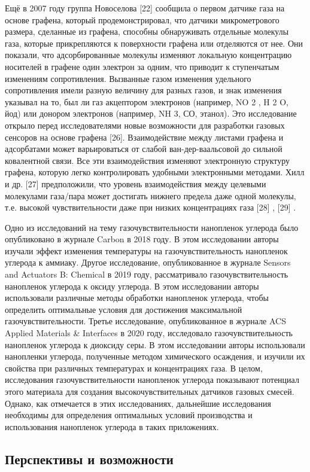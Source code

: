 \documentclass[14pt]{extarticle}
\begin{document}
Ещё в 2007 году группа Новоселова [22] сообщила о первом датчике газа на основе графена, который продемонстрировал, что датчики микрометрового размера, сделанные из графена, способны обнаруживать отдельные молекулы газа, которые прикрепляются к поверхности графена или отделяются от нее. Они показали, что адсорбированные молекулы изменяют локальную концентрацию носителей в графене один электрон за одним, что приводит к ступенчатым изменениям сопротивления. Вызванные газом изменения удельного сопротивления имели разную величину для разных газов, и знак изменения указывал на то, был ли газ акцептором электронов (например, NO 2 , H 2 O, йод) или донором электронов (например, NH 3, СО, этанол). Это исследование открыло перед исследователями новые возможности для разработки газовых сенсоров на основе графена [26]. Взаимодействие между листами графена и адсорбатами может варьироваться от слабой ван-дер-ваальсовой до сильной ковалентной связи. Все эти взаимодействия изменяют электронную структуру графена, которую легко контролировать удобными электронными методами. Хилл и др. [27] предположили, что уровень взаимодействия между целевыми молекулами газа/пара может достигать нижнего предела даже одной молекулы, т.е. высокой чувствительности даже при низких концентрациях газа [28] , [29] .

Одно из исследований на тему газочувствительности нанопленок углерода было опубликовано в журнале Carbon в 2018 году. В этом исследовании авторы изучали эффект изменения температуры на газочувствительность нанопленок углерода к аммиаку.
Другое исследование, опубликованное в журнале Sensors and Actuators B: Chemical в 2019 году, рассматривало газочувствительность нанопленок углерода к оксиду углерода. В этом исследовании авторы использовали различные методы обработки нанопленок углерода, чтобы определить оптимальные условия для достижения максимальной газочувствительности.
Третье исследование, опубликованное в журнале ACS Applied Materials \& Interfaces в 2020 году, исследовало газочувствительность нанопленок углерода к диоксиду серы. В этом исследовании авторы использовали нанопленки углерода, полученные методом химического осаждения, и изучили их свойства при различных температурах и концентрациях газа.
В целом, исследования газочувствительности нанопленок углерода показывают потенциал этого материала для создания высокочувствительных датчиков газовых смесей. Однако, как отмечается в этих исследованиях, дальнейшие исследования необходимы для определения оптимальных условий производства и использования нанопленок углерода в таких приложениях.



\subsection{Перспективы и возможности}



\end{document}
